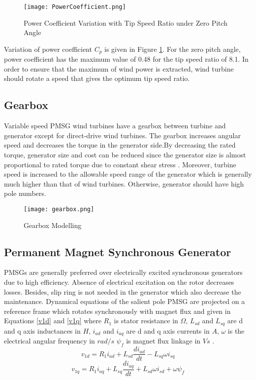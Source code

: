 \begin{figure}[h!]
	\centering
	\texttt{[image: PowerCoefficient.png]}
	\caption{Power Coefficient Variation with Tip Speed Ratio under Zero Pitch Angle}
	\label{variationofcp}
\end{figure} 
Variation of power coefficient $C_{p}$ is given in Figure \ref{variationofcp}. For the zero pitch angle, power coefficient has the maximum value of 0.48 for the tip speed ratio of 8.1. In order to ensure that the maximum of wind power is extracted, wind turbine should rotate a speed that gives the optimum tip speed ratio. 

\subsection{Gearbox}  
Variable speed PMSG wind turbines have a gearbox between turbine and generator except for direct-drive wind turbines. The gearbox increases angular speed and decreases the torque in the generator side.By decreasing the rated torque, generator size and cost can be reduced since the generator size is almost proportional to rated torque due to constant shear stress \cite{Polinder2013aa}. Moreover, turbine speed is increased to the allowable speed range of the generator which is generally much higher than that of wind turbines. Otherwise, generator should have high pole numbers. 
\begin{figure}[h!]
	\centering
	\texttt{[image: gearbox.png]}
	\caption{Gearbox Modelling}
	\label{gearboxmodel}
\end{figure}

\subsection{Permanent Magnet Synchronous Generator}
\label{pmsgsection}
PMSGs are generally preferred over electrically excited synchronous generators due to high efficiency. Absence of electrical excitation on the rotor decreases losses. Besides, slip ring is not needed in the generator which also decrease the maintenance. Dynamical equations of the salient pole PMSG are projected on a reference frame which rotates synchronously with magnet flux and given in Equations \ref{v1d} and \ref{v1q} where $R_{1}$ is stator resistance in $\Omega$, $L_{sd}$ and $L_{sq}$ are d and q axis inductances in $H$, $i_{ad}$ and $i_{aq}$ are d and q axis currents in $A$, $\omega$ is the electrical angular frequency in $rad/s$ $\psi_{f}$ is magnet flux linkage in $Vs$ \cite{Ackermann2005a}. 
\begin{equation}
v_{1d}=R_{1} i_{ad}+L_{sd}\frac{di_{ad}}{dt}-L_{sq}\omega i_{sq}
\label{v1d}
\end{equation}
\begin{equation}
v_{1q}=R_{1} i_{aq}+L_{sq}\frac{di_{aq}}{dt}+L_{sd}\omega i_{sd}+\omega \psi_{f}
\label{v1q}
\end{equation}

